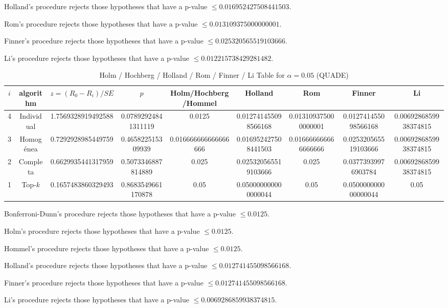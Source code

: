 \documentclass[a4paper,10pt]{article}
\begin{document}
\begin{landscape}
Holland's procedure rejects those hypotheses that have a p-value $\le0.016952427508441503$.


Rom's procedure rejects those hypotheses that have a p-value $\le0.013109375000000001$.


Finner's procedure rejects those hypotheses that have a p-value $\le0.025320565519103666$.


Li's procedure rejects those hypotheses that have a p-value $\le0.012215738429281482$.



\newpage

\begin{table}[!htp]
\centering\scriptsize
\caption{Holm / Hochberg / Holland / Rom / Finner / Li Table for $\alpha=0.05$ (QUADE)}
\begin{tabular}{ccccccccc}
$i$&algorithm&$z=(R_0 - R_i)/SE$&$p$&Holm/Hochberg/Hommel&Holland&Rom&Finner&Li\\
\hline
4&Individual&1.7569328919492588&0.07892924841311119&0.0125&0.012741455098566168&0.013109375000000001&0.012741455098566168&0.0069286859938374815\\
3&Homogénea&0.7292928985449759&0.465822515309939&0.016666666666666666&0.016952427508441503&0.016666666666666666&0.025320565519103666&0.0069286859938374815\\
2&Completa&0.6629935441317959&0.5073346887814889&0.025&0.025320565519103666&0.025&0.03773939976903784&0.0069286859938374815\\
1&Top-$k$&0.1657483860329493&0.8683549661170878&0.05&0.050000000000000044&0.05&0.050000000000000044&0.05\\
\hline
\end{tabular}
\end{table}
Bonferroni-Dunn's procedure rejects those hypotheses that have a p-value $\le0.0125$.


Holm's procedure rejects those hypotheses that have a p-value $\le0.0125$.


Hommel's procedure rejects those hypotheses that have a p-value $\le0.0125$.


Holland's procedure rejects those hypotheses that have a p-value $\le0.012741455098566168$.


Finner's procedure rejects those hypotheses that have a p-value $\le0.012741455098566168$.


Li's procedure rejects those hypotheses that have a p-value $\le0.0069286859938374815$.



\newpage


\end{landscape}
\end{document}
